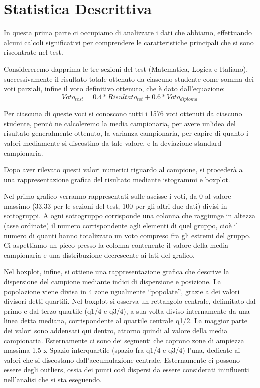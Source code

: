 \section{Statistica Descrittiva}

In questa prima parte ci occupiamo di analizzare i dati che abbiamo, effettuando alcuni calcoli significativi per comprendere le caratteristiche principali che si sono riscontrate nel test.

Considereremo dapprima le tre sezioni del test (Matematica, Logica e Italiano), successivamente il risultato totale ottenuto da ciascuno studente come somma dei voti parziali, infine il voto definitivo ottenuto, che è dato dall’equazione:
\[
Voto_{test} = 0.4 * Risultato_{tot} + 0.6 * Voto_{diploma}
\]

Per ciascuna di queste voci si conoscono tutti i 1576 voti ottenuti da ciascuno
studente, perciò ne calcoleremo la media campionaria, per avere un’idea del
risultato generalmente ottenuto, la varianza campionaria, per capire di quanto i
valori mediamente si discostino da tale valore, e la deviazione standard
campionaria.

Dopo aver rilevato questi valori numerici riguardo al campione, si procederà a una
rappresentazione grafica del risultato mediante istogrammi e boxplot.

Nel primo grafico verranno rappresentati sulle ascisse i voti, da 0 al valore massimo (33,33 per le sezioni del test, 100 per gli altri due dati) divisi in sottogruppi.
A ogni sottogruppo corrisponde una colonna che raggiunge in altezza (asse ordinate) 
  il numero corrispondente agli elementi di quel gruppo, cioè il numero di quanti hanno
 totalizzato un voto compreso fra gli estremi del gruppo.
Ci aspettiamo un picco presso la colonna contenente il valore della media campionaria e una distribuzione decrescente ai lati del grafico.

Nel boxplot, infine, si ottiene una rappresentazione grafica che descrive la dispersione del campione mediante indici di dispersione e posizione. La popolazione viene divisa in 4 zone ugualmente “popolate”, grazie a dei valori divisori detti quartili. Nel boxplot si osserva un rettangolo centrale, delimitato dal primo e dal terzo quartile (q1/4 e q3/4), a sua volta diviso internamente da una linea detta mediana, corrispondente al quartile centrale q1/2. La maggior parte dei valori sono addensati qui dentro, attorno quindi al valore della media campionaria. Esternamente ci sono dei segmenti che coprono zone di ampiezza massima 1,5 x Spazio interquartile (spazio fra q1/4 e q3/4) l’una, dedicate ai valori che si discostano dall’accumulazione centrale. Esternamente ci possono essere degli outliers, ossia dei punti così dispersi da essere considerati ininfluenti nell’analisi che si sta eseguendo. 

